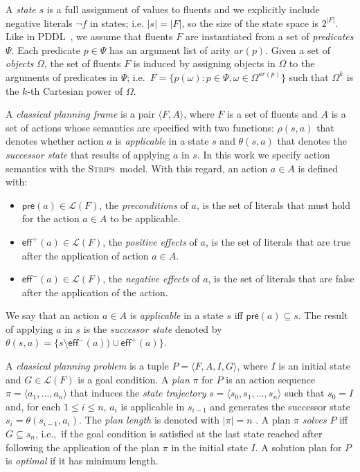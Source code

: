 \documentclass[letterpaper]{article} %
\newcommand{\tup}[1]{{\langle #1 \rangle}}
\newcommand{\pre}{\mathsf{pre}}     %
\newcommand{\eff}{\mathsf{eff}}     %
\newcommand{\strips}{\textsc{Strips}}     %
\begin{document}
A {\em state} $s$ is a full assignment of values to fluents and we explicitly include negative literals $\neg f$ in states; i.e. $|s|=|F|$, so the size of the state space is $2^{|F|}$. Like in PDDL~\cite{fox2003pddl2}, we assume that fluents $F$ are instantiated from a set of {\em predicates} $\Psi$. Each predicate $p\in\Psi$ has an argument list of arity $ar(p)$. Given a set of {\em objects} $\Omega$, the set of fluents $F$ is induced by assigning objects in $\Omega$ to the arguments of predicates in $\Psi$; i.e.~$F=\{p(\omega):p\in\Psi,\omega\in\Omega^{ar(p)}\}$ such that $\Omega^k$ is the $k$-th Cartesian power of $\Omega$.

A {\em classical planning frame} is a pair $\tup{F,A}$, where $F$ is a set of fluents and $A$ is a set of actions whose semantics are specified with two functions: $\rho(s,a)$ that denotes whether action $a$ is {\em applicable} in a state $s$ and $\theta(s,a)$ that denotes the {\em successor state} that results of applying $a$ in $s$. In this work we specify action semantics with the \strips\ model. With this regard, an action $a\in A$ is defined with:
\begin{itemize}
\item $\pre(a)\in\mathcal{L}(F)$, the {\em preconditions} of $a$, is the set of literals that must hold for the action $a\in A$ to be applicable.
\item $\eff^+(a)\in\mathcal{L}(F)$, the {\em positive effects} of $a$, is the set of literals that are true after the application of action $a\in A$.
\item $\eff^-(a)\in\mathcal{L}(F)$, the {\em negative effects} of $a$, is the set of literals that are false after the application of the action.
\end{itemize}
We say that an action $a\in A$ is {\em applicable} in a state $s$ iff $\pre(a)\subseteq s$. The result of applying $a$ in $s$ is the {\em successor state} denoted by $\theta(s,a)=\{s\setminus\eff^-(a))\cup\eff^+(a)\}$.

A {\em classical planning problem} is a tuple $P=\tup{F,A,I,G}$, where $I$ is an initial state and $G\in\mathcal{L}(F)$ is a goal condition. A {\em plan} $\pi$ for $P$ is an action sequence $\pi=\tup{a_1, \ldots, a_n}$ that induces the {\em state trajectory} $s=\tup{s_0, s_1, \ldots, s_n}$ such that $s_0=I$ and, for each {\small $1\leq i\leq n$}, $a_i$ is applicable in $s_{i-1}$ and generates the successor state $s_i=\theta(s_{i-1},a_i)$. The {\em plan length} is denoted with $|\pi|=n$ . A plan $\pi$ {\em solves} $P$ iff $G\subseteq s_n$, i.e.,~if the goal condition is satisfied at the last state reached after following the application of the plan $\pi$ in the initial state $I$. A solution plan for $P$ is {\em optimal} if it has minimum length.
\end{document}
